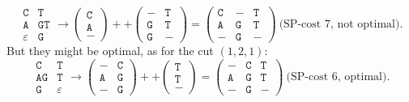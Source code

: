 \begin{bsp}
{\[            \begin{array}{c|c}
                \mathtt{C} & \mathtt{T}\\
                \mathtt{A} & \mathtt{GT}\\
                \varepsilon & \mathtt{G}
            \end{array}
            \to
            \begin{pmatrix}
                \mathtt{C}\\\mathtt{A}\\\mathtt{-}
            \end{pmatrix}
            ++
            \begin{pmatrix}
                \mathtt{-}&\mathtt{T}\\\mathtt{G}&\mathtt{T}\\\mathtt{G}&\mathtt{-}
            \end{pmatrix}
            =
            \begin{pmatrix}
                \mathtt{C}&\mathtt{-}&\mathtt{T}\\\mathtt{A}&\mathtt{G}&\mathtt{T}\\
                \mathtt{-}&\mathtt{G}&\mathtt{-}
            \end{pmatrix}
            \ \text{(SP-cost 7, not optimal).}
        \]
        But they might be optimal, as for the cut $(1,2,1)$:
        \[
            \begin{array}{c|c}
                \mathtt{C} & \mathtt{T}\\
                \mathtt{AG} & \mathtt{T}\\
                \mathtt{G} & \varepsilon
            \end{array}
            \to
            \begin{pmatrix}
                \mathtt{-}&\mathtt{C}\\\mathtt{A}&\mathtt{G}\\\mathtt{-}&\mathtt{G}
            \end{pmatrix}
            ++
            \begin{pmatrix}
                \mathtt{T}\\\mathtt{T}\\\mathtt{-}
            \end{pmatrix}
            =
            \begin{pmatrix}
                \mathtt{-}&\mathtt{C}&\mathtt{T}\\\mathtt{A}&\mathtt{G}&\mathtt{T}\\
                \mathtt{-}&\mathtt{G}&\mathtt{-}
            \end{pmatrix}
            \ \text{(SP-cost 6, optimal).}
        \]}
\end{bsp}

